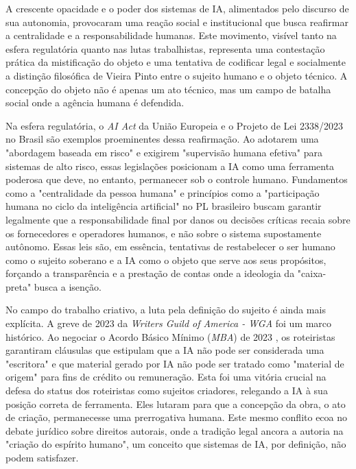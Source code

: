 A crescente opacidade e o poder dos sistemas de IA, alimentados pelo discurso de sua autonomia, provocaram uma reação social e institucional que busca reafirmar a centralidade 
e a responsabilidade humanas. 
Este movimento, visível tanto na esfera regulatória quanto nas lutas trabalhistas, representa uma contestação prática da mistificação do objeto e 
uma tentativa de codificar legal e socialmente a distinção filosófica de Vieira Pinto entre o sujeito humano e o objeto técnico. 
A concepção do objeto não é apenas um ato 
técnico, mas um campo de batalha social onde a agência humana é defendida. 

Na esfera regulatória, o \textit{AI Act} da União Europeia \cite{EU_AI_Act2024} e o Projeto de Lei 2338/2023 no Brasil \cite{Brasil_PL2338} são exemplos proeminentes dessa reafirmação. 
Ao adotarem uma "abordagem baseada 
em risco" e exigirem "supervisão humana efetiva" para sistemas de alto risco, essas legislações posicionam a IA como uma ferramenta poderosa que deve, no entanto, permanecer sob 
o controle humano. 
Fundamentos como a "centralidade da pessoa humana" e princípios como a "participação humana no ciclo da inteligência artificial" no PL brasileiro buscam 
garantir legalmente que a responsabilidade final por danos ou decisões críticas recaia sobre os fornecedores e operadores humanos, e não sobre o sistema supostamente autônomo. 
Essas leis são, em essência, tentativas de restabelecer o ser humano como o sujeito soberano e a IA como o objeto que serve aos seus propósitos, forçando a transparência e a 
prestação de contas onde a ideologia da "caixa-preta" busca a isenção. 

No campo do trabalho criativo, a luta pela definição do sujeito é ainda mais explícita. 
A greve de 2023 da \textit{Writers Guild of America - WGA} foi um marco histórico. 
Ao 
negociar o Acordo Básico Mínimo (\textit{MBA}) de 2023 \cite{WGA_MBA2023}, os roteiristas garantiram cláusulas que estipulam que a IA não pode ser considerada uma "escritora" e que material gerado por IA 
não pode ser tratado como "material de origem" para fins de crédito ou remuneração. 
Esta foi uma vitória crucial na defesa do status dos roteiristas como sujeitos criadores, 
relegando a IA à sua posição correta de ferramenta. 
Eles lutaram para que a concepção da obra, o ato de criação, permanecesse uma prerrogativa humana. 
Este mesmo conflito ecoa 
no debate jurídico sobre direitos autorais, onde a tradição legal ancora a autoria na "criação do espírito humano", um conceito que sistemas de IA, por definição, não podem 
satisfazer. 

